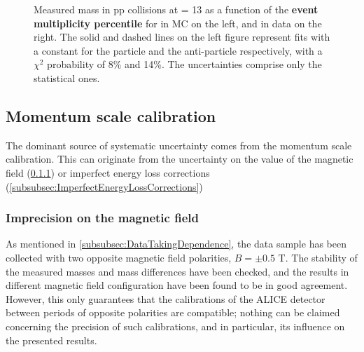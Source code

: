 \begin{figure}[h]
\hspace*{-1.5cm}
\caption{Measured mass in pp collisions at \sqrtS = 13 \tev as a function of the \textbf{event multiplicity percentile} for \rmLambda in MC on the left, and in data on the right. The solid and dashed lines on the left figure represent fits with a constant for the particle and the anti-particle respectively, with a $\chi^{2}$ probability of 8\% and 14\%. The uncertainties comprise only the statistical ones.}
	\label{fig:MassVsMult}
\end{figure}

\subsection{Momentum scale calibration}

The dominant source of systematic uncertainty comes from the momentum scale calibration. This can originate from the uncertainty on the value of the magnetic field (\Sec\ref{subsubsec:ImprecisionMagneticField}) or imperfect energy loss corrections (\Sec\ref{subsubsec:ImperfectEnergyLossCorrections})

\subsubsection{Imprecision on the magnetic field}
\label{subsubsec:ImprecisionMagneticField}

As mentioned in \Sec\ref{subsubsec:DataTakingDependence}, the data sample has been collected with two opposite magnetic field polarities, $B = \pm 0.5$ T. The stability of the measured masses and mass differences have been checked, and the results in different magnetic field configuration have been found to be in good agreement. However, this only guarantees that the calibrations of the ALICE detector between periods of opposite polarities are compatible; nothing can be claimed concerning the precision of such calibrations, and in particular, its influence on the presented results.\\


